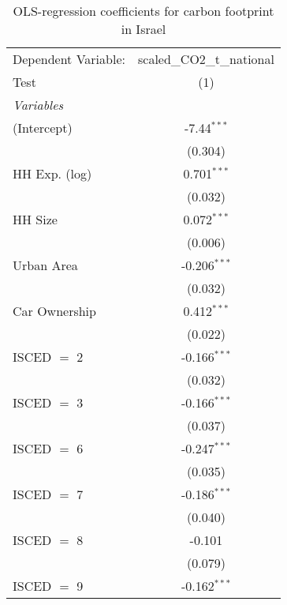 
\begin{table}[htbp!]
   \centering
   \small
   \begin{adjustbox}{width = 1\textwidth, max height = 0.95\textheight, center}
      \begin{threeparttable}[b]
         \caption{\label{tab:OLS_2_ISR} OLS-regression coefficients for carbon footprint in Israel}
         \begin{tabular}{lc}
            \tabularnewline \midrule \midrule
            Dependent Variable: & scaled\_CO2\_t\_national\\     
            Test                & (1)\\  
            \midrule
            \emph{Variables}\\
            (Intercept)         & -7.44$^{***}$\\   
                                & (0.304)\\   
            HH Exp. (log)       & 0.701$^{***}$\\   
                                & (0.032)\\   
            HH Size             & 0.072$^{***}$\\   
                                & (0.006)\\   
            Urban Area          & -0.206$^{***}$\\   
                                & (0.032)\\   
            Car Ownership       & 0.412$^{***}$\\   
                                & (0.022)\\   
            ISCED $=$ 2         & -0.166$^{***}$\\   
                                & (0.032)\\   
            ISCED $=$ 3         & -0.166$^{***}$\\   
                                & (0.037)\\   
            ISCED $=$ 6         & -0.247$^{***}$\\   
                                & (0.035)\\   
            ISCED $=$ 7         & -0.186$^{***}$\\   
                                & (0.040)\\   
            ISCED $=$ 8         & -0.101\\   
                                & (0.079)\\   
            ISCED $=$ 9         & -0.162$^{***}$\\   

\end{tabular}
\end{threeparttable}
\end{adjustbox}
\end{table}
